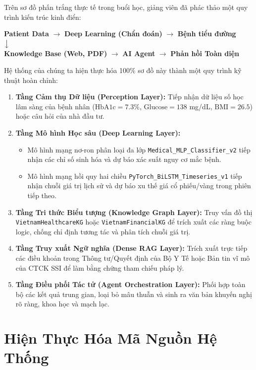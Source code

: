 \documentclass[12pt,a4paper]{report}
\begin{document}
Trên sơ đồ phấn trắng thực tế trong buổi học, giảng viên đã phác thảo một quy trình kiến trúc kinh điển:
\begin{center}
    \textbf{Patient Data} $\longrightarrow$ \textbf{Deep Learning (Chẩn đoán)} $\longrightarrow$ \textbf{Bệnh tiểu đường} \\
    $\big\downarrow$ \\
    \textbf{Knowledge Base (Web, PDF)} $\longrightarrow$ \textbf{AI Agent} $\longrightarrow$ \textbf{Phản hồi Toàn diện}
\end{center}

Hệ thống của chúng ta hiện thực hóa 100\% sơ đồ này thành một quy trình kỹ thuật hoàn chỉnh:
\begin{enumerate}
    \item \textbf{Tầng Cảm thụ Dữ liệu (Perception Layer):} Tiếp nhận dữ liệu số học lâm sàng của bệnh nhân ($\text{HbA1c} = 7.3\%$, $\text{Glucose} = 138$ mg/dL, $\text{BMI} = 26.5$) hoặc câu hỏi của nhà đầu tư.
    \item \textbf{Tầng Mô hình Học sâu (Deep Learning Layer):}
    \begin{itemize}
        \item Mô hình mạng nơ-ron phân loại đa lớp \texttt{Medical\_MLP\_Classifier\_v2} tiếp nhận các chỉ số sinh hóa và dự báo xác suất nguy cơ mắc bệnh.
        \item Mô hình mạng hồi quy hai chiều \texttt{PyTorch\_BiLSTM\_Timeseries\_v1} tiếp nhận chuỗi giá trị lịch sử và dự báo xu thế giá cổ phiếu/vàng trong phiên tiếp theo.
    \end{itemize}
    \item \textbf{Tầng Tri thức Biểu tượng (Knowledge Graph Layer):} Truy vấn đồ thị \texttt{VietnamHealthcareKG} hoặc \texttt{VietnamFinancialKG} để trích xuất các ràng buộc logic, chống chỉ định tương tác và phân tích chuỗi giá trị.
    \item \textbf{Tầng Truy xuất Ngữ nghĩa (Dense RAG Layer):} Trích xuất trực tiếp các điều khoản trong Thông tư/Quyết định của Bộ Y Tế hoặc Bản tin vĩ mô của CTCK SSI để làm bằng chứng tham chiếu pháp lý.
    \item \textbf{Tầng Điều phối Tác tử (Agent Orchestration Layer):} Phối hợp toàn bộ các kết quả trung gian, loại bỏ mâu thuẫn và sinh ra văn bản khuyến nghị rõ ràng, khoa học và mạch lạc.
\end{enumerate}

\section{Hiện Thực Hóa Mã Nguồn Hệ Thống}
\end{document}
